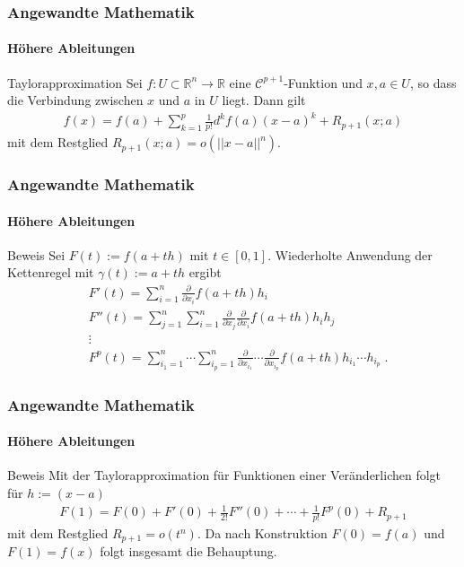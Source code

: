 \documentclass{beamer}
\begin{document}
\begin{frame}
    \frametitle{Angewandte Mathematik}
\framesubtitle{Höhere Ableitungen}
    \begin{block}{Taylorapproximation}
Sei   $f:  U \subset \mathbb{R}^n \to \mathbb{R}$ eine $\mathcal{C}^{p+1}$-Funktion und $x,a \in U$, so dass die Verbindung zwischen $x$ und $a$ in $U$ liegt.
Dann gilt
\begin{align*}
f(x) = f(a) + \sum_{k=1}^{p}\frac{1}{p!} d^k f(a) (x-a)^k + R_{p+1} (x;a)
\end{align*}
mit dem Restglied $R_{p+1} (x;a) =   o(||x - a||^n)$.

\end{block}
 \end{frame}


\begin{frame}
    \frametitle{Angewandte Mathematik}
\framesubtitle{Höhere Ableitungen}
    \begin{block}{Beweis}
Sei $F(t) := f(a + th)$ mit $t \in [0,1]$. Wiederholte Anwendung der Kettenregel mit $\gamma(t) := a +th$ ergibt
\begin{align*}
& F'(t) = \sum_{i=1}^n  \frac{\partial}{\partial x_{i}} f(a + th) h_i \\
& F''(t) =\sum_{j=1}^n \sum_{i=1}^n   \frac{\partial}{\partial x_{j}} \frac{\partial}{\partial x_{i}} f(a + th) h_i h_j \\
& \vdots \\
& F^p(t) =  \sum_{i_1=1}^n  \cdots \sum_{i_p=1}^n   \frac{\partial}{\partial x_{i_1}} \cdots \frac{\partial}{\partial x_{i_p}} f(a + th) h_{i_1} \cdots  h_{i_p}  \; .
\end{align*}
\end{block}
 \end{frame}

\begin{frame}
    \frametitle{Angewandte Mathematik}
\framesubtitle{Höhere Ableitungen}
    \begin{block}{Beweis}
Mit der Taylorapproximation für Funktionen einer Veränderlichen  folgt für $h := (x-a)$ 
\begin{align*}
 F(1) = F(0) + F'(0) + \frac{1}{2!} F''(0) + \cdots + \frac{1}{p!} F^p(0) + R_{p+1} 
\end{align*}
mit dem Restglied $ R_{p+1}  =    o(t^n)$.
Da nach Konstruktion $F(0) = f(a)$ und $F(1)= f(x)$ folgt insgesamt die Behauptung.
\end{block}
 \end{frame}
\end{document}
